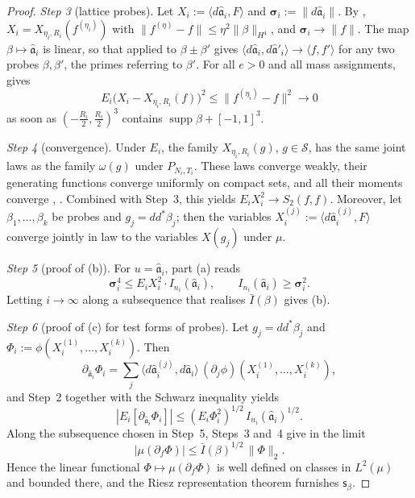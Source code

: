 \documentclass[11pt]{amsart}
\theoremstyle{definition}
\begin{document}
\begin{proof}
\emph{Step 3} (lattice probes).
Let $X_i:=\langle d\hat{\mathfrak a}_i,F\rangle$ and $\boldsymbol\sigma_i:=\|d\hat{\mathfrak a}_i\|$.
By \cite[Proposition~47.1\,(b2$'$), (b3), (b5)]{QEDIII}, $X_i=X_{\eta_i,R_i}(f^{(\eta_i)})$ with $\|f^{(\eta)}-f\|\le\eta^2\|\beta\|_{H^4}$, and $\boldsymbol\sigma_i\to\|f\|$.
The map $\beta\mapsto\hat{\mathfrak a}_i$ is linear, so that \cite[Proposition~47.1\,(b5)]{QEDIII} applied to $\beta\pm\beta'$ gives $\langle d\hat{\mathfrak a}_i,\allowbreak d\hat{\mathfrak a}'_i\rangle\to\langle f,\allowbreak f'\rangle$ for any two probes $\beta,\beta'$, the primes referring to $\beta'$.
For all $e>0$ and all mass assignments, \cite[Chapter~44, Lemma~2.1\,(a)--(c)]{QEDIII} gives
\begin{equation*}
E_i\bigl(X_i-X_{\eta_i,R_i}(f)\bigr)^2\le\|f^{(\eta_i)}-f\|^2\to0
\end{equation*}
as soon as $(-\frac{R_i}2,\frac{R_i}2)^3$ contains $\operatorname{supp}\beta+[-1,1]^3$.

\emph{Step 4} (convergence).
Under $E_i$, the family $X_{\eta_i,R_i}(g)$, $g\in\mathcal S$, has the same joint laws as the family $\omega(g)$ under $P_{N_i,T_i}$.
These laws converge weakly, their generating functions converge uniformly on compact sets, and all their moments converge \cite[Theorem~1.3\,(a)]{QEDII}, \cite[Chapter~44, Lemma~2.2]{QEDIII}.
Combined with Step~3, this yields $E_iX_i^2\to S_2(f,f)$.
Moreover, let $\beta_1,\dots,\beta_k$ be probes and $g_j=dd^*\beta_j$; then the variables $X_i^{(j)}:=\langle d\hat{\mathfrak a}_i^{(j)},F\rangle$ converge jointly in law to the variables $X(g_j)$ under $\mu$.

\emph{Step 5} (proof of (b)).
For $u=\hat{\mathfrak a}_i$, part (a) reads
\begin{equation*}
\boldsymbol\sigma_i^4\le E_iX_i^2\cdot I_{n_i}(\hat{\mathfrak a}_i),\qquad I_{n_i}(\hat{\mathfrak a}_i)\ge\boldsymbol\sigma_i^2.
\end{equation*}
Letting $i\to\infty$ along a subsequence that realises $\bar I(\beta)$ gives (b).

\emph{Step 6} (proof of (c) for test forms of probes).
Let $g_j=dd^*\beta_j$ and $\Phi_i:=\phi(X_i^{(1)},\dots,X_i^{(k)})$.
Then
\begin{equation*}
\partial_{\hat{\mathfrak a}_i}\Phi_i=\sum_j\langle d\hat{\mathfrak a}_i^{(j)},d\hat{\mathfrak a}_i\rangle\,(\partial_j\phi)(X_i^{(1)},\dots,X_i^{(k)}),
\end{equation*}
and Step~2 together with the Schwarz inequality yields
\begin{equation*}
|E_i[\partial_{\hat{\mathfrak a}_i}\Phi_i]|\le(E_i\Phi_i^2)^{1/2}\,I_{n_i}(\hat{\mathfrak a}_i)^{1/2}.
\end{equation*}
Along the subsequence chosen in Step~5, Steps~3 and~4 give in the limit
\begin{equation*}
|\mu(\partial_f\Phi)|\le\bar I(\beta)^{1/2}\,\|\Phi\|_2.
\end{equation*}
Hence the linear functional $\Phi\mapsto\mu(\partial_f\Phi)$ is well defined on classes in $L^2(\mu)$ and bounded there, and the Riesz representation theorem furnishes $\mathsf s_\beta$.


\end{proof}
\end{document}
